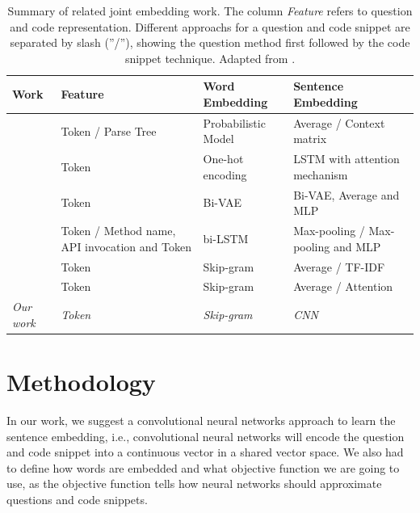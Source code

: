 \documentclass[sigconf]{acmart}
\begin{document}
\begin{table}[t]
\centering
\begin{tabular}{ l p{1.5cm} p{1.5cm} p{1.5cm} }
 \hline
 \textbf{Work} & \textbf{Feature} & \textbf{Word Embedding} & \textbf{Sentence Embedding} \\
 \hline
\citet{Allamanis-bimodal-source-code-natural-language:2015} & Token / Parse Tree & Probabilistic Model & Average / Context matrix  \\

\citet{iyer-etal-2016-summarizing} & Token & One-hot encoding & LSTM with attention mechanism  \\

\citet{Chen-bi-variational-autoencoder:2018} & Token & Bi-VAE & Bi-VAE, Average and MLP  \\

\citet{Gu-deep-code-search:2018} & Token / Method name, API invocation and Token & bi-LSTM & Max-pooling / Max-pooling and MLP   \\

\citet{Sachdev-neural-code-search:2018} & Token & Skip-gram & Average / TF-IDF   \\

\citet{cambronero-deep-code-search-2019} & Token & Skip-gram & Average / Attention   \\

\textit{Our work} & \textit{Token} & \textit{Skip-gram} & \textit{CNN}   \\

 \hline
\end{tabular}
\caption{Summary of related joint embedding work. The column \emph{Feature} refers to question and code representation. Different approachs for a question and code snippet are separated by slash (''/''), showing the question method first followed by the code snippet technique. Adapted from \cite{yan-benchmark-code-search-information-retrieval-deep-learning:2020}.}
\label{table:summary-joint-embedding-related-work}
\end{table}

\section{Methodology}
\label{sec:methodology}

 In our work, we suggest a convolutional neural networks approach to learn the sentence embedding, i.e., convolutional neural networks will encode the question and code snippet into a continuous vector in a shared vector space. We also had to define how words are embedded and what objective function we are going to use, as the objective function tells how neural networks should approximate questions and code snippets.
\end{document}
